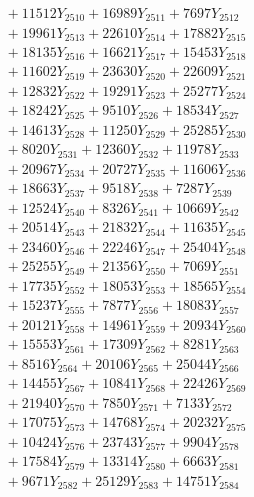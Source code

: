 \documentclass[a4paper,10pt]{article}
\begin{document}
{\begin{align}
&\;  + 11512 Y_{2510} + 16989 Y_{2511} + 7697 Y_{2512} \\[0.3ex]
&\;  + 19961 Y_{2513} + 22610 Y_{2514} + 17882 Y_{2515} \\[0.3ex]
&\;  + 18135 Y_{2516} + 16621 Y_{2517} + 15453 Y_{2518} \\[0.5ex]\allowbreak
&\;  + 11602 Y_{2519} + 23630 Y_{2520} + 22609 Y_{2521} \\[0.3ex]
&\;  + 12832 Y_{2522} + 19291 Y_{2523} + 25277 Y_{2524} \\[0.3ex]
&\;  + 18242 Y_{2525} + 9510 Y_{2526} + 18534 Y_{2527} \\[0.3ex]
&\;  + 14613 Y_{2528} + 11250 Y_{2529} + 25285 Y_{2530} \\[0.3ex]
&\;  + 8020 Y_{2531} + 12360 Y_{2532} + 11978 Y_{2533} \\[0.3ex]
&\;  + 20967 Y_{2534} + 20727 Y_{2535} + 11606 Y_{2536} \\[0.3ex]
&\;  + 18663 Y_{2537} + 9518 Y_{2538} + 7287 Y_{2539} \\[0.3ex]
&\;  + 12524 Y_{2540} + 8326 Y_{2541} + 10669 Y_{2542} \\[0.3ex]
&\;  + 20514 Y_{2543} + 21832 Y_{2544} + 11635 Y_{2545} \\[0.3ex]
&\;  + 23460 Y_{2546} + 22246 Y_{2547} + 25404 Y_{2548} \\[0.5ex]\allowbreak
&\;  + 25255 Y_{2549} + 21356 Y_{2550} + 7069 Y_{2551} \\[0.3ex]
&\;  + 17735 Y_{2552} + 18053 Y_{2553} + 18565 Y_{2554} \\[0.3ex]
&\;  + 15237 Y_{2555} + 7877 Y_{2556} + 18083 Y_{2557} \\[0.3ex]
&\;  + 20121 Y_{2558} + 14961 Y_{2559} + 20934 Y_{2560} \\[0.3ex]
&\;  + 15553 Y_{2561} + 17309 Y_{2562} + 8281 Y_{2563} \\[0.3ex]
&\;  + 8516 Y_{2564} + 20106 Y_{2565} + 25044 Y_{2566} \\[0.3ex]
&\;  + 14455 Y_{2567} + 10841 Y_{2568} + 22426 Y_{2569} \\[0.3ex]
&\;  + 21940 Y_{2570} + 7850 Y_{2571} + 7133 Y_{2572} \\[0.3ex]
&\;  + 17075 Y_{2573} + 14768 Y_{2574} + 20232 Y_{2575} \\[0.3ex]
&\;  + 10424 Y_{2576} + 23743 Y_{2577} + 9904 Y_{2578} \\[0.5ex]\allowbreak
&\;  + 17584 Y_{2579} + 13314 Y_{2580} + 6663 Y_{2581} \\[0.3ex]
&\;  + 9671 Y_{2582} + 25129 Y_{2583} + 14751 Y_{2584} \\[0.3ex]

\end{align}}
\end{document}
